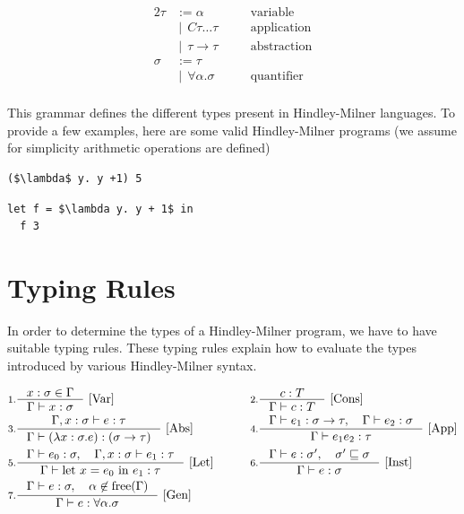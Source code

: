 \documentclass[book.tex]{subfiles}
\begin{document}
\begin{alignat*}{2}
    \tau &:= \alpha \quad &&\textrm{variable} \\
    &\ |\ \ C \tau \dotsc \tau \quad &&\textrm{application} \\
    &\ |\ \ \tau \to \tau \quad &&\textrm{abstraction} \\
    \sigma &:= \tau  \\
    &\ |\ \ \forall \alpha . \sigma \quad &&\textrm{quantifier} \\
\end{alignat*}

This grammar defines the different types present in Hindley-Milner languages. To provide a few examples, here are some valid Hindley-Milner programs (we assume for simplicity arithmetic operations are defined)
\begin{lstlisting}
($\lambda$ y. y +1) 5
\end{lstlisting}
\begin{lstlisting}
let f = $\lambda y. y + 1$ in
  f 3  
\end{lstlisting}

\section{Typing Rules}

In order to determine the types of a Hindley-Milner program, we have to have suitable typing rules. These typing rules explain how to evaluate the types introduced by various Hindley-Milner syntax.

\begin{alignat*}{2}
    &\inference[1.]
    {
     x: \sigma \in \Gamma
    }
    {
    \Gamma \vdash x : \sigma
    } \ \textrm{[Var]} &&\qquad
    \inference[2.]
    {
     c : T
    }
    {
     \Gamma \vdash c : T 
    } \ \textrm{[Cons]} \\
    &\inference[3.]
    {
     \Gamma, x: \sigma \vdash e : \tau
    }
    {
     \Gamma \vdash (\lambda x: \sigma . e) : (\sigma \to \tau)
    } \ \textrm{[Abs]}
    &&\qquad 
    \inference[4.]
    { 
     \Gamma \vdash e_1: \sigma \to \tau, \quad \Gamma \vdash e_2 : \sigma
    }
    {
     \Gamma \vdash e_1 e_2 : \tau
    } \ \textrm{[App]}
    \\
    &\inference[5.]
    {
     \Gamma \vdash e_0 : \sigma, \quad \Gamma, x: \sigma \vdash e_1 : \tau 
    }
    {
     \Gamma \vdash \textrm{let } x = e_0 \textrm{ in } e_1 : \tau 
    } \ \textrm{[Let]}
    &&\qquad 
    \inference[6.]
    {
     \Gamma \vdash e : \sigma', \quad \sigma' \sqsubseteq \sigma  
    }
    {
     \Gamma \vdash e : \sigma 
    } \ \textrm{[Inst]}
    \\
    &\inference[7.]
    {
     \Gamma \vdash e : \sigma, \quad \alpha \not\in \textrm{free}(\Gamma)  
    }
    {
     \Gamma \vdash e : \forall \alpha . \sigma 
    } \ \textrm{[Gen]}
\end{alignat*}
\end{document}
